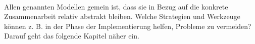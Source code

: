 \\
Allen genannten Modellen gemein ist, dass sie in Bezug auf die konkrete Zusammenarbeit relativ abstrakt bleiben. Welche Strategien und Werkzeuge können z. B. in der Phase der Implementierung helfen, Probleme zu vermeiden? Darauf geht das folgende Kapitel näher ein.




